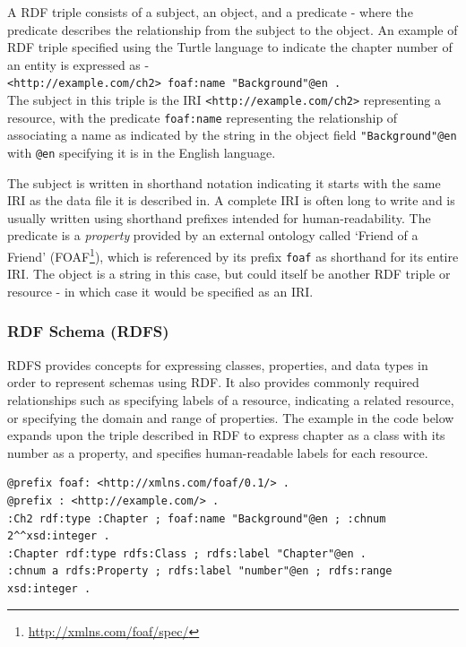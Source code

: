 A RDF triple consists of a subject, an object, and a predicate - where the predicate describes the relationship from the subject to the object. An example of RDF triple specified using the Turtle language to indicate the chapter number of an entity is expressed as -\\ \-\hspace{5mm}\texttt{<http://example.com/ch2> foaf:name "Background"@en .}\\
The subject in this triple is the IRI \texttt{<http://example.com/ch2>} representing a resource, with the predicate \texttt{foaf:name} representing the relationship of associating a name as indicated by the string in the object field \texttt{"Background"@en} with \texttt{@en} specifying it is in the English language. 

The subject is written in shorthand notation indicating it starts with the same IRI as the data file it is described in. A complete IRI is often long to write and is usually written using shorthand prefixes intended for human-readability.
The predicate is a \textit{property} provided by an external ontology called `Friend of a Friend' (FOAF\footnote{\url{http://xmlns.com/foaf/spec/}}), which is referenced by its prefix \texttt{foaf} as shorthand for its entire IRI.
The object is a string in this case, but could itself be another RDF triple or resource - in which case it would be specified as an IRI.

\subsubsection{RDF Schema (RDFS)}
RDFS provides concepts for expressing classes, properties, and data types in order to represent schemas using RDF. It also provides commonly required relationships such as specifying labels of a resource, indicating a related resource, or specifying the domain and range of properties. The example in the code below expands upon the triple described in RDF to express chapter as a class with its number as a property, and specifies human-readable labels for each resource.
\begin{verbatim}
@prefix foaf: <http://xmlns.com/foaf/0.1/> .
@prefix : <http://example.com/> .
:Ch2 rdf:type :Chapter ; foaf:name "Background"@en ; :chnum 2^^xsd:integer .
:Chapter rdf:type rdfs:Class ; rdfs:label "Chapter"@en .
:chnum a rdfs:Property ; rdfs:label "number"@en ; rdfs:range xsd:integer .
\end{verbatim}

